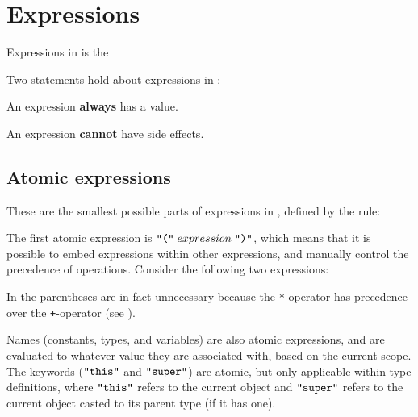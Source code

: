 \section{Expressions}
\label{sec:expressions}

Expressions in \productname{} is the 

\begin{ebnf}
\end{ebnf}

Two statements hold about expressions in \productname{}:

\begin{nlist}
\item An expression \textbf{always} has a value.
\item An expression \textbf{cannot} have side effects.
\end{nlist}

\subsection{Atomic expressions}

These are the smallest possible parts of expressions in \productname{}, defined by
the rule:

\begin{ebnf}
\end{ebnf}

The first atomic expression is $\texttt{"("} \; expression \; \texttt{")"}$, which means
that it is possible to embed expressions within other expressions, and manually control
the precedence of operations. Consider the following two expressions:


In  the parentheses are in fact unnecessary because the
\texttt{*}-operator has precedence over the \texttt{+}-operator (see
).

Names (constants, types, and variables) are also atomic expressions, and are evaluated
to whatever value they are associated with, based on the current scope. The keywords
($\texttt{"this"}$ and $\texttt{"super"}$) are atomic, but only applicable within type
definitions, where $\texttt{"this"}$ refers to the current object and $\texttt{"super"}$
refers to the current object casted to its parent type (if it has one). 

